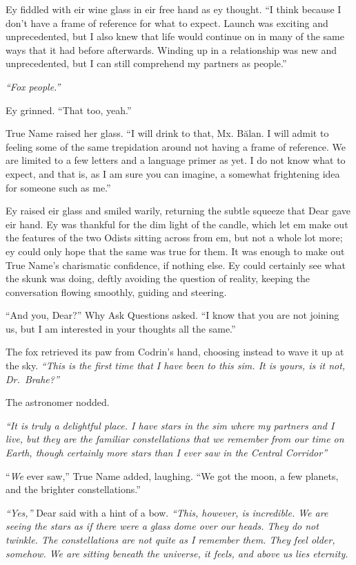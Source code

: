 Ey fiddled with eir wine glass in eir free hand as ey thought. ``I think because I don't have a frame of reference for what to expect. Launch was exciting and unprecedented, but I also knew that life would continue on in many of the same ways that it had before afterwards. Winding up in a relationship was new and unprecedented, but I can still comprehend my partners as people.''

\emph{``Fox people.''}

Ey grinned. ``That too, yeah.''

True Name raised her glass. ``I will drink to that, Mx. Bălan. I will admit to feeling some of the same trepidation around not having a frame of reference. We are limited to a few letters and a language primer as yet. I do not know what to expect, and that is, as I am sure you can imagine, a somewhat frightening idea for someone such as me.''

Ey raised eir glass and smiled warily, returning the subtle squeeze that Dear gave eir hand. Ey was thankful for the dim light of the candle, which let em make out the features of the two Odists sitting across from em, but not a whole lot more; ey could only hope that the same was true for them. It was enough to make out True Name's charismatic confidence, if nothing else. Ey could certainly see what the skunk was doing, deftly avoiding the question of reality, keeping the conversation flowing smoothly, guiding and steering.

``And you, Dear?'' Why Ask Questions asked. ``I know that you are not joining us, but I am interested in your thoughts all the same.''

The fox retrieved its paw from Codrin's hand, choosing instead to wave it up at the sky. \emph{``This is the first time that I have been to this sim. It is yours, is it not, Dr.~Brahe?''}

The astronomer nodded.

\emph{``It is truly a delightful place. I have stars in the sim where my partners and I live, but they are the familiar constellations that we remember from our time on Earth, though certainly more stars than I ever saw in the Central Corridor''}

``\emph{We} ever saw,'' True Name added, laughing. ``We got the moon, a few planets, and the brighter constellations.''

\emph{``Yes,''} Dear said with a hint of a bow. \emph{``This, however, is incredible. We are seeing the stars as if there were a glass dome over our heads. They do not twinkle. The constellations are not quite as I remember them. They feel older, somehow. We are sitting beneath the universe, it feels, and above us lies eternity.}

